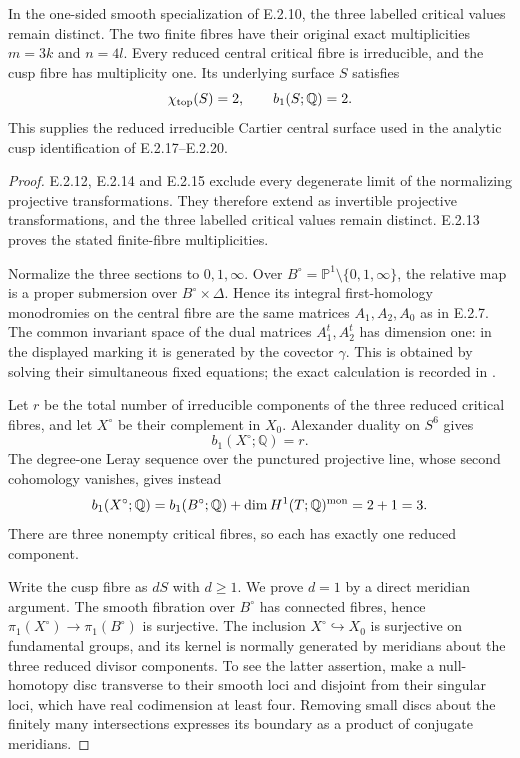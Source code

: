 \begin{proposition}
In the one-sided smooth specialization of E.2.10,
the three labelled critical values remain distinct.
The two finite fibres have their original exact
multiplicities $m=3k$ and $n=4l$.  Every reduced
central critical fibre is irreducible, and the
cusp fibre has multiplicity one.  Its underlying
surface $S$ satisfies
\[
 \chi_{\rm top}(S)=2,\qquad b_1(S;\mathbb Q)=2.
\]
This supplies the reduced irreducible Cartier central
surface used in the analytic cusp identification of
E.2.17--E.2.20.
\end{proposition}
\begin{proof}
E.2.12, E.2.14 and E.2.15 exclude every degenerate
limit of the normalizing projective transformations.
They therefore extend as invertible projective
transformations, and the three labelled critical
values remain distinct.  E.2.13 proves the stated
finite-fibre multiplicities.

Normalize the three sections to $0,1,\infty$.
Over $B^\circ=\mathbb P^1\setminus\{0,1,\infty\}$,
the relative map is a proper submersion over
$B^\circ\times\Delta$.  Hence its integral
first-homology monodromies on the central fibre
are the same matrices $A_1,A_2,A_0$ as in
E.2.7.  The common invariant space of the dual
matrices $A_1^t,A_2^t$ has dimension one:
in the displayed marking it is generated by
the covector $\gamma$.  This is obtained by
solving their simultaneous fixed equations;
the exact calculation is recorded in
.

Let $r$ be the total number of irreducible
components of the three reduced critical
fibres, and let $X^\circ$ be their complement
in $X_0$.  Alexander duality on $S^6$ gives
\[
 b_1(X^\circ;\mathbb Q)=r.
\]
The degree-one Leray sequence over the
punctured projective line, whose second
cohomology vanishes, gives instead
\[
 b_1(X^\circ;\mathbb Q)
 =b_1(B^\circ;\mathbb Q)
   +\dim H^1(T;\mathbb Q)^{\rm mon}
 =2+1=3.
\]
There are three nonempty critical fibres,
so each has exactly one reduced component.

Write the cusp fibre as $dS$ with $d\ge1$.
We prove $d=1$ by a direct meridian argument.
The smooth fibration over $B^\circ$ has
connected fibres, hence
$\pi_1(X^\circ)\to\pi_1(B^\circ)$ is
surjective.  The inclusion
$X^\circ\hookrightarrow X_0$ is surjective
on fundamental groups, and its kernel is
normally generated by meridians about the
three reduced divisor components.  To see
the latter assertion, make a null-homotopy
disc transverse to their smooth loci and
disjoint from their singular loci, which
have real codimension at least four.
Removing small discs about the finitely
many intersections expresses its boundary
as a product of conjugate meridians.


\end{proof}

